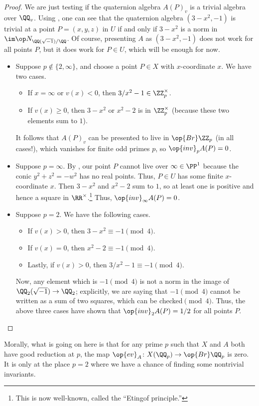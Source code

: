 \documentclass[../notes.tex]{subfiles}
\begin{document}
\begin{proof}
	We are just testing if the quaternion algebra $A(P)_v$ is a trivial algebra over $\QQ_v$. Using , one can see that the quaternion algebra $\left(3-x^2,-1\right)$ is trivial at a point $P=(x,y,z)$ in $U$ if and only if $3-x^2$ is a norm in $\im\op N_{\QQ(\sqrt{-1})/\QQ}$. Of course, presenting $A$ as $\left(3-x^2,-1\right)$ does not work for all points $P$, but it does work for $P\in U$, which will be enough for now.
	\begin{itemize}
		\item Suppose $p\notin\{2,\infty\}$, and choose a point $P\in X$ with $x$-coordinate $x$. We have two cases.
		\begin{itemize}
			\item If $x=\infty$ or $v(x)<0$, then $3/x^2-1\in\ZZ_p^\times$.
			\item If $v(x)\ge0$, then $3-x^2$ or $x^2-2$ is in $\ZZ_p^\times$ (because these two elements sum to $1$).
		\end{itemize}
		It follows that $A(P)_v$ can be presented to live in $\op{Br}\ZZ_p$ (in all cases!), which vanishes for finite odd primes $p$, so $\op{inv}_pA(P)=0$.
		\item Suppose $p=\infty$. By , our point $P$ cannot live over $\infty\in\PP^1$ because the conic $y^2+z^2=-w^2$ has no real points. Thus, $P\in U$ has some finite $x$-coordinate $x$. Then $3-x^2$ and $x^2-2$ sum to $1$, so at least one is positive and hence a square in $\RR^\times$.\footnote{This is now well-known, called the ``Etingof principle.''} Thus, $\op{inv}_\infty A(P)=0$.
		\item Suppose $p=2$. We have the following cases.
		\begin{itemize}
			\item If $v(x)>0$, then $3-x^2\equiv-1\pmod4$.
			\item If $v(x)=0$, then $x^2-2\equiv-1\pmod4$.
			\item Lastly, if  $v(x)>0$, then $3/x^2-1\equiv-1\pmod4$.
		\end{itemize}
		Now, any element which is $-1\pmod4$ is not a norm in the image of $\QQ_2(\sqrt{-1})\to\QQ_2$; explicitly, we are saying that $-1\pmod4$ cannot be written as a sum of two squares, which can be checked$\pmod4$. Thus, the above three cases have shown that $\op{inv}_2A(P)=1/2$ for all points $P$.
		\qedhere
	\end{itemize}
\end{proof}
\begin{remark}
	Morally, what is going on here is that for any prime $p$ such that $X$ and $A$ both have good reduction at $p$, the map $\op{ev}_A\colon X(\QQ_p)\to\op{Br}\QQ_p$ is zero. It is only at the place $p=2$ where we have a chance of finding some nontrivial invariants.
\end{remark}
\end{document}
